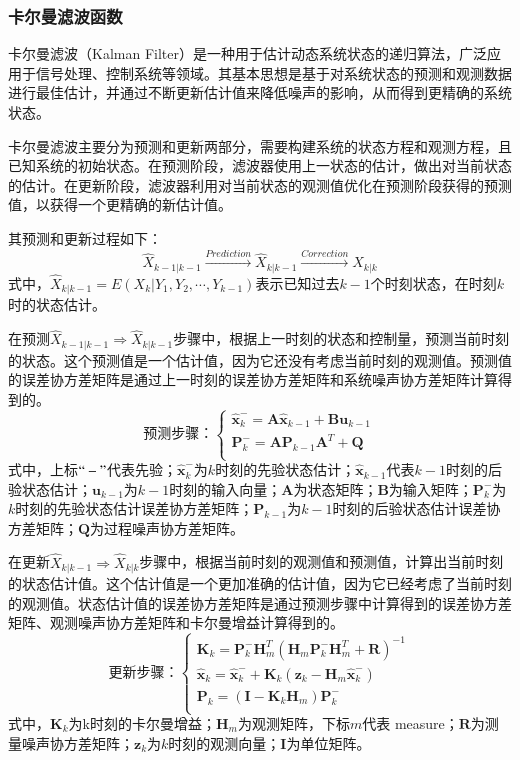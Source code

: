 \subsubsection{卡尔曼滤波函数}
卡尔曼滤波（Kalman Filter）是一种用于估计动态系统状态的递归算法，广泛应用于信号处理、控制系统等领域。其基本思想是基于对系统状态的预测和观测数据进行最佳估计，并通过不断更新估计值来降低噪声的影响，从而得到更精确的系统状态。

卡尔曼滤波主要分为预测和更新两部分，需要构建系统的状态方程和观测方程，且已知系统的初始状态。在预测阶段，滤波器使用上一状态的估计，做出对当前状态的估计。在更新阶段，滤波器利用对当前状态的观测值优化在预测阶段获得的预测值，以获得一个更精确的新估计值。

其预测和更新过程如下：
$$
\hat{X}_{k-1|k-1}\xrightarrow{Prediction}\hat{X}_{k|k-1}\xrightarrow{Correction}\hat{X}_{k|k}
$$
式中，$\hat{X}_{k|k-1}=E\left( X_k|Y_1,Y_2,\cdots ,Y_{k-1} \right)$表示已知过去$k-1$个时刻状态，在时刻$k$时的状态估计。

在预测$\hat{X}_{k-1|k-1} \Rightarrow \hat{X}_{k|k-1}$步骤中，根据上一时刻的状态和控制量，预测当前时刻的状态。这个预测值是一个估计值，因为它还没有考虑当前时刻的观测值。预测值的误差协方差矩阵是通过上一时刻的误差协方差矩阵和系统噪声协方差矩阵计算得到的。
$$
\text{预测步骤：}\left\{ \begin{array}{l}
	\boldsymbol{\hat{x}}_{k}^{-}=\boldsymbol{A\hat{x}}_{k-1}+\boldsymbol{Bu}_{k-1} \\
	\boldsymbol{P}_{k}^{-}=\boldsymbol{AP}_{k-1}\boldsymbol{A}^T+\boldsymbol{Q}\\
\end{array}\right. 
$$
式中，上标$``-"$代表先验；$\boldsymbol{\hat{x}}_{k}^{-}$为$k$时刻的先验状态估计；$\boldsymbol{\hat{x}}_{k-1}$代表$k-1$时刻的后验状态估计；$\boldsymbol{u}_{k-1}$为$k-1$时刻的输入向量；$\boldsymbol{A}$为状态矩阵；$\boldsymbol{B}$为输入矩阵；$\boldsymbol{P}_{k}^{-}$为$k$时刻的先验状态估计误差协方差矩阵；$\boldsymbol{P}_{k-1}$为$k-1$时刻的后验状态估计误差协方差矩阵；$\boldsymbol{Q}$为过程噪声协方差矩阵。

在更新$\hat{X}_{k|k-1}\Rightarrow \hat{X}_{k|k}$步骤中，根据当前时刻的观测值和预测值，计算出当前时刻的状态估计值。这个估计值是一个更加准确的估计值，因为它已经考虑了当前时刻的观测值。状态估计值的误差协方差矩阵是通过预测步骤中计算得到的误差协方差矩阵、观测噪声协方差矩阵和卡尔曼增益计算得到的。
$$
\text{更新步骤：}\left\{ \begin{array}{l}
	\boldsymbol{K}_k=\boldsymbol{P}_{k}^{-}\boldsymbol{H}_{m}^{T}(\boldsymbol{H}_m\boldsymbol{P}_{k}^{-}\boldsymbol{H}_{m}^{T}+\boldsymbol{R})^{-1}\\ 
	\boldsymbol{\hat{x}}_k=\boldsymbol{\hat{x}}_{k}^{-}+\boldsymbol{K}_k\left( \boldsymbol{z}_k-\boldsymbol{H}_m\boldsymbol{\hat{x}}_{k}^{-} \right)\\
	\boldsymbol{P}_k=\left( \boldsymbol{I}-\boldsymbol{K}_k\boldsymbol{H}_m \right) \boldsymbol{P}_{k}^{-}\\
\end{array} \right. 
$$
式中，$\boldsymbol{K}_k$为k时刻的卡尔曼增益；$\boldsymbol{H}_m$为观测矩阵，下标$m$代表 measure；$\boldsymbol{R}$为测量噪声协方差矩阵；$\boldsymbol{z}_k$为$k$时刻的观测向量；$\boldsymbol{I}$为单位矩阵。

